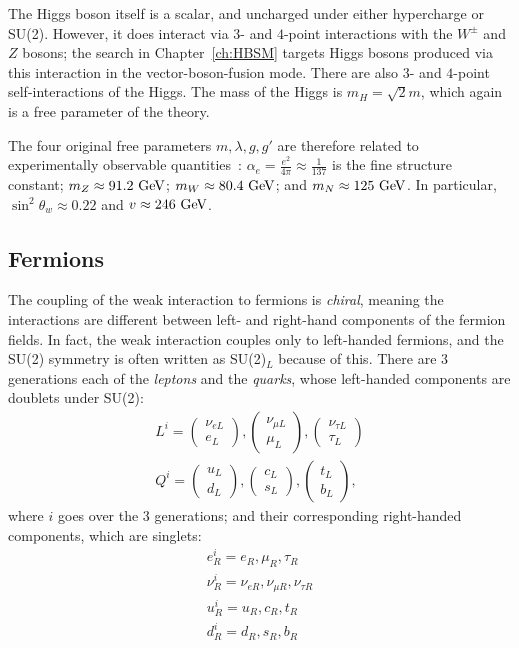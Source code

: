 The Higgs boson itself is a scalar, and uncharged under either hypercharge or SU(2).
However, it does interact via $3$- and $4$-point interactions with the $W^\pm$ and $Z$ bosons; the search in Chapter~\ref{ch:HBSM} targets Higgs bosons produced via this interaction in the vector-boson-fusion mode.
There are also $3$- and $4$-point self-interactions of the Higgs.
The mass of the Higgs is $m_H = \sqrt{2}m$, which again is a free parameter of the theory.

The four original free parameters $m,\lambda,g,g'$ are therefore related to experimentally observable quantities~\cite{PDG}: $\alpha_e = \frac{e^2}{4\pi} \approx \frac{1}{137}$ is the fine structure constant; $m_Z \approx 91.2~\mathrm{GeV}$; $m_W \approx 80.4~\mathrm{GeV}$; and $m_N \approx 125~\mathrm{GeV}$.
In particular, $\sin^2\theta_w \approx 0.22$ and $v \approx 246~\mathrm{GeV}$.

\subsection{Fermions}
\label{sec:SM:EW_matter}
The coupling of the weak interaction to fermions is \textit{chiral}, meaning the interactions are different between left- and right-hand components of the fermion fields.
In fact, the weak interaction couples only to left-handed fermions, and the SU(2) symmetry is often written as SU(2)$_L$ because of this.
There are $3$ generations each of the \textit{leptons} and the \textit{quarks}, whose left-handed components are doublets under SU(2):
\begin{align}
L^i = \begin{pmatrix}\nu_{eL}\\e_L\end{pmatrix},\begin{pmatrix}\nu_{\mu L}\\\mu_L\end{pmatrix},\begin{pmatrix}\nu_{\tau L}\\\tau_L\end{pmatrix}\\
Q^i = \begin{pmatrix}u_{L}\\d_L\end{pmatrix},\begin{pmatrix}c_{L}\\s_L\end{pmatrix},\begin{pmatrix}t_{L}\\b_L\end{pmatrix},
\end{align}
where $i$ goes over the $3$ generations; and their corresponding right-handed components, which are singlets:
\begin{align}
e^i_R = e_R,\mu_R,\tau_R\\
\nu^i_R = \nu_{eR},\nu_{\mu R},\nu_{\tau R}\\
u^i_R = u_R,c_R,t_R\\
d^i_R = d_R,s_R,b_R
\end{align}

